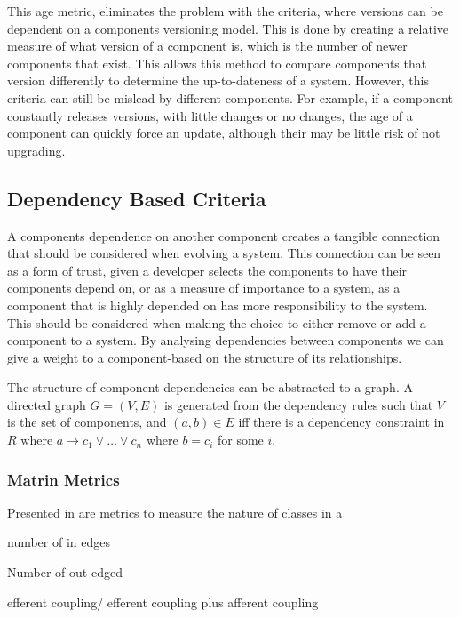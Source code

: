 This age metric, eliminates the problem with the criteria, where versions can be dependent on a components versioning model.
This is done by creating a relative measure of what version of a component is, which is the number of newer components that exist.
This allows this method to compare components that version differently to determine the up-to-dateness of a system.
However, this criteria can still be mislead by different components.
For example, if a component constantly releases versions, with little changes or no changes, the age of a component can quickly force an update, 
although their may be little risk of not upgrading. 





\subsection{Dependency Based Criteria}
A components dependence on another component creates a tangible connection that should be considered when evolving a system.
This connection can be seen as a form of trust, given a developer selects the components to have their components depend on,
or as a measure of importance to a system, as a component that is highly depended on has more responsibility to the system.
This should be considered when making the choice to either remove or add a component to a system.
By analysing dependencies between components we can give a weight to a component-based on the structure of its relationships.

The structure of component dependencies can be abstracted to a graph.
A directed graph $G = (V,E)$ is generated from the
dependency rules such that $V$ is the set of components, and $(a,b) \in E$ iff there is a dependency constraint in $R$ 
where $a \rightarrow c_1 \vee \ldots \vee c_n$ where $b = c_i$ for some $i$.


\subsubsection{Matrin Metrics}
Presented in \cite{} are metrics to measure the nature of classes in a

number of in edges

Number of out edged



efferent coupling/ efferent coupling plus afferent coupling

